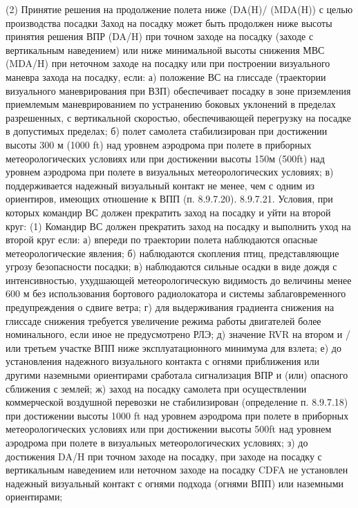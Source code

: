 (2) Принятие решения на продолжение полета ниже (DA(H)/ (MDA(H)) с целью производства посадки
Заход на посадку может быть продолжен ниже высоты принятия решения ВПР (DA/H) при точном заходе на посадку (заходе с вертикальным наведением) или ниже минимальной высоты снижения МВС (MDA/H) при неточном заходе на посадку или при построении визуального маневра захода на посадку, если:
а)	положение ВС на глиссаде (траектории визуального маневрирования при ВЗП) обеспечивает посадку в зоне приземления приемлемым маневрированием по устранению боковых уклонений в пределах разрешенных, с вертикальной скоростью, обеспечивающей перегрузку на посадке в допустимых пределах;
б)	полет самолета стабилизирован при достижении высоты 300 м (1000 ft) над уровнем аэродрома при полете в приборных метеорологических условиях или при достижении высоты 150м (500ft) над уровнем аэродрома при полете в визуальных метеорологических условиях;
в)	поддерживается надежный визуальный контакт не менее, чем с одним из ориентиров, имеющих отношение к ВПП (п. 8.9.7.20).
8.9.7.21.	Условия, при которых командир ВС должен прекратить заход на посадку и уйти 
                                                                    на второй круг:
(1) Командир ВС должен прекратить заход на посадку и выполнить уход на второй круг если:
а)	впереди по траектории полета наблюдаются опасные метеорологические явления;
б)	наблюдаются скопления птиц, представляющие угрозу безопасности посадки;
в)	наблюдаются сильные осадки в виде дождя с интенсивностью, ухудшающей метеорологическую видимость до величины менее 600 м без использования бортового радиолокатора и системы заблаговременного предупреждения о сдвиге ветра;
г)	для выдерживания градиента снижения на глиссаде снижения требуется увеличение режима работы двигателей более номинального, если иное не предусмотрено РЛЭ;
д)	значение RVR на втором и / или третьем участке ВПП ниже эксплуатационного минимума для взлета;
е)	до установления надежного визуального контакта с огнями приближения или другими наземными ориентирами сработала сигнализация ВПР и (или) опасного сближения с землей;
ж)	заход на посадку самолета при осуществлении коммерческой воздушной перевозки не стабилизирован (определение п. 8.9.7.18) при достижении высоты 1000 ft над уровнем аэродрома при полете в приборных метеорологических условиях или при достижении высоты 500ft над уровнем аэродрома при полете в визуальных метеорологических условиях;
з)	до достижения DA/H при точном заходе на посадку, при заходе на посадку с вертикальным наведением или неточном заходе на посадку CDFA не установлен надежный визуальный контакт с огнями подхода (огнями ВПП) или наземными ориентирами;
